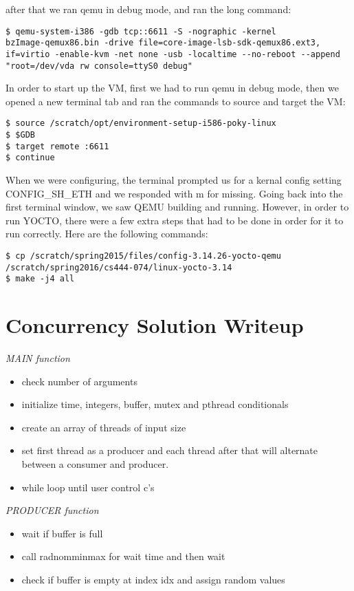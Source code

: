 \documentclass[letterpaper,10pt,titlepage]{article}
\begin{document}
after that we ran qemu in debug mode, and ran the long command:

\begin{lstlisting}
$ qemu-system-i386 -gdb tcp::6611 -S -nographic -kernel
bzImage-qemux86.bin -drive file=core-image-lsb-sdk-qemux86.ext3,
if=virtio -enable-kvm -net none -usb -localtime --no-reboot --append
"root=/dev/vda rw console=ttyS0 debug"
\end{lstlisting}
In order to start up the VM, first we had to run qemu in debug mode, then we opened a new terminal tab and ran the commands to source and target the VM:

\begin{lstlisting}
$ source /scratch/opt/environment-setup-i586-poky-linux
$ $GDB
$ target remote :6611
$ continue
\end{lstlisting}

When we were configuring, the terminal prompted us for a kernal config setting CONFIG\_SH\_ETH and we responded with m for missing. Going back into the first terminal window, we saw QEMU building and running. However, in order to run YOCTO, there were a few extra steps that had to be done in order for it to run correctly. Here are the following commands:

\begin{lstlisting}
$ cp /scratch/spring2015/files/config-3.14.26-yocto-qemu
/scratch/spring2016/cs444-074/linux-yocto-3.14
$ make -j4 all
\end{lstlisting}


\section{Concurrency Solution Writeup}

\textit{\large{MAIN function}}
\begin{itemize}
	\item check number of arguments
    \item initialize time, integers, buffer, mutex and pthread conditionals
    \item create an array of threads of input size
    \item set first thread as a producer and each thread after that will alternate between a consumer and producer.
    \item while loop until user control c's

\end{itemize}
\textit{\large{PRODUCER function}}
\begin{itemize}
	\item wait if buffer is full
    \item call radnomminmax for wait time and then wait
    \item check if buffer is empty at index idx and assign random values

\end{itemize}
\end{document}
